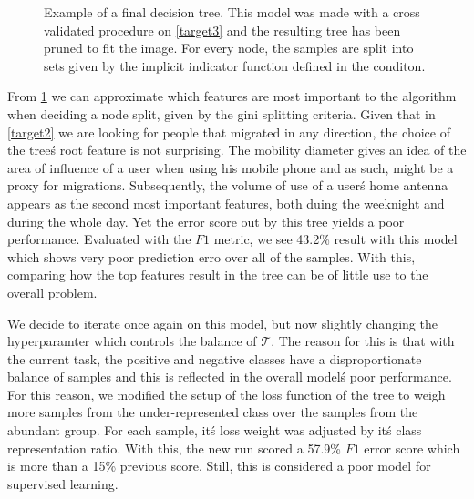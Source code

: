 \begin{figure}[tb]
\centering
\caption{ Example of a final decision tree. This model was made with a cross validated procedure on \cref{target3} and the resulting tree has been pruned to fit the image. For every node, the samples are split into sets given by the implicit indicator function defined in the conditon.}
\label{fig:decision_tree_actual_problem}
\end{figure}

From \cref{fig:decision_tree_actual_problem} we can approximate which features are most important to the algorithm when deciding a node split, given by the gini splitting criteria.
Given that in \cref{target2} we are looking for people that migrated in any direction, the choice of the tree\'s root feature is not surprising.
The mobility diameter gives an idea of the area of influence of a user when using his mobile phone and as such, might be a proxy for migrations.
Subsequently, the volume of use of a user\'s home antenna appears as the second most important features, both duing the weeknight and during the whole day.
Yet the error score out by this tree yields a poor performance. Evaluated with the $F1$ metric, we see 43.2\% result with this model which shows very poor prediction erro over all of the samples.
With this, comparing how the top features result in the tree can be of little use to the overall problem.

We decide to iterate once again on this model, but now slightly changing the hyperparamter which controls the balance of $\mathcal{T}$.
The reason for this is that with the current task, the positive and negative classes have a disproportionate balance of samples and this is reflected in the overall model\'s poor performance.
For this reason, we modified the setup of the loss function of the tree to weigh more samples from the under-represented class over the samples from the abundant group.
For each sample, it\'s loss weight was adjusted by it\'s class representation ratio.
With this, the new run scored a 57.9\% $F1$ error score which is more than a 15\% previous score.
Still, this is considered a poor model for supervised learning.


